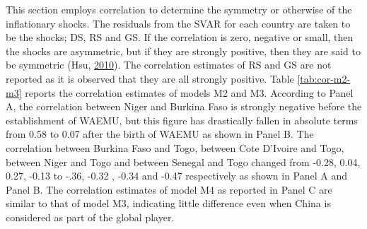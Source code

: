 \documentclass[]{article}
\begin{document}
This section employs correlation to determine the symmetry or otherwise of the inflationary shocks. The residuals from the SVAR for each country are taken to be the shocks; DS, RS and GS. If the correlation is zero, negative or small, then the shocks are asymmetric, but if they are strongly positive, then they are said to be symmetric (Hsu, \protect\hyperlink{ref-hsu2010common}{2010}). The correlation estimates of RS and GS are not reported as it is observed that they are all strongly positive. Table \ref{tab:cor-m2-m3} reports the correlation estimates of models M2 and M3. According to Panel A, the correlation between Niger and Burkina Faso is strongly negative before the establishment of WAEMU, but this figure has drastically fallen in absolute terms from 0.58 to 0.07 after the birth of WAEMU as shown in Panel B. The correlation between Burkina Faso and Togo, between Cote D'Ivoire and Togo, between Niger and Togo and between Senegal and Togo changed from -0.28, 0.04, 0.27, -0.13 to -.36, -0.32 , -0.34 and -0.47 respectively as shown in Panel A and Panel B. The correlation estimates of model M4 as reported in Panel C are similar to that of model M3, indicating little difference even when China is considered as part of the global player.

\begingroup\fontsize{9}{11}\selectfont
\end{document}

